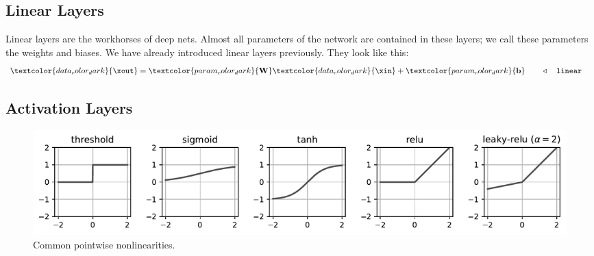 \subsection{Linear Layers}
Linear layers are the workhorses of deep nets. Almost all parameters of the network are contained in these layers; we call these parameters the weights and biases. We have already introduced linear layers previously. They look like this:
\begin{align}
    \textcolor{data_color_dark}{\xout} = \textcolor{param_color_dark}{\mathbf{W}} \textcolor{data_color_dark}{\xin} + \textcolor{param_color_dark}{\mathbf{b}} & \quad\quad \triangleleft \quad\texttt{linear}
\end{align}

\subsection{Activation Layers}

\begin{figure}[t]
    \centerline{
    \includegraphics[width=1.0\linewidth]{./figures/neural_nets/pointwise_nonlinearities.pdf}
    }
    \caption{Common pointwise nonlinearities.}
    \label{fig:neural_nets:pointwise_nonlinearities}
\end{figure}

